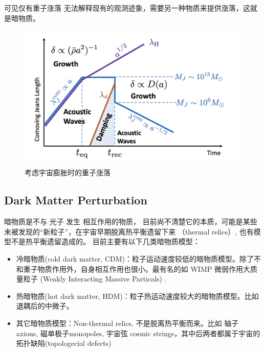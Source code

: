 \documentclass[12pt]{ctexart}
\begin{document}
可见仅有重子涨落 无法解释现有的观测迹象，需要另一种物质来提供涨落，这就是暗物质。

\begin{figure}[!hbtp]
	\centering 
	\includegraphics[width=1.0\linewidth]{Baryon_pert_H.png}
	\caption{考虑宇宙膨胀时的重子涨落}
    \label{fig:Bary_pert}
\end{figure}


\subsection{Dark Matter Perturbation}

暗物质是不与 光子 发生 相互作用的物质，
目前尚不清楚它的本质，可能是某些未被发现的“新粒子”，在宇宙早期脱离热平衡遗留下来 （thermal relics）,
也有模型不是热平衡遗留造成的。
目前主要有以下几类暗物质模型：
\begin{itemize}
    \item 冷暗物质(cold dark matter, CDM)：粒子运动速度较低的暗物质模型。除了不和重子物质作用外，自身相互作用也很小。最有名的如 WIMP 微弱作用大质量粒子 (Weakly Interacting Massive Particals) .
    \item 热暗物质(hot dark matter, HDM)：粒子热运动速度较大的暗物质模型。比如退耦后的中微子。
    \item 其它暗物质模型：Non-thermal relics, 不是脱离热平衡而来。比如 轴子 axions, 磁单极子monopoles, 宇宙弦 cosmic strings，其中后两者都属于宇宙的拓扑缺陷(topologecial defects)
\end{itemize}
\end{document}
